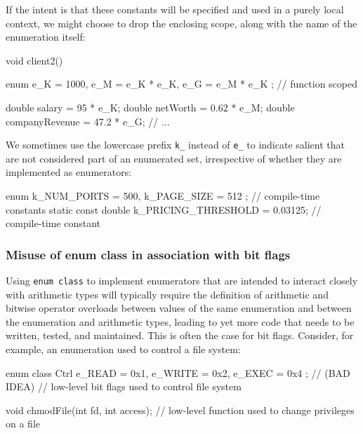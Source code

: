 \noindent If the intent is that these constants will be specified and used in a
purely local context, we might choose to drop the enclosing scope, along
with the name of the enumeration itself: 

\begin{emcppslisting}
void client2()
{
    enum { e_K = 1000, e_M = e_K * e_K, e_G = e_M * e_K };  // function scoped

    double salary = 95 * e_K;
    double netWorth = 0.62 * e_M;
    double companyRevenue = 47.2 * e_G;
    // ...
}
\end{emcppslisting}

\noindent We sometimes use the
lowercase prefix \lstinline!k_! instead of \lstinline!e_! to indicate
salient  that are not considered part
of an enumerated set, irrespective of whether they are implemented as
enumerators:

\begin{emcppslisting}[language=C++]
enum { k_NUM_PORTS = 500, k_PAGE_SIZE = 512 };     // compile-time constants
static const double k_PRICING_THRESHOLD = 0.03125; // compile-time constant
\end{emcppslisting}

\subsubsection[Misuse of \lstinline!enum! \lstinline!class! in association with bit flags]{Misuse of {\SubsubsecCode enum} {\SubsubsecCode class} in association with bit flags}\label{misuse-of-enum-class-in-association-with-bit-flags}

Using \lstinline!enum!~\lstinline!class! to implement enumerators that are
intended to interact closely with arithmetic types will typically
require the definition of arithmetic and bitwise operator overloads
between values of the same enumeration and between the enumeration and
arithmetic types, leading to yet more code that needs to be written,
tested, and maintained. This is often the case for bit flags. Consider, for example, an
enumeration used to control a file system:

\begin{emcppslisting}[emcppsbatch=e14]
enum class Ctrl { e_READ = 0x1, e_WRITE = 0x2, e_EXEC = 0x4 };  // (BAD IDEA)
    // low-level bit flags used to control file system

void chmodFile(int fd, int access);
    // low-level function used to change privileges on a file
\end{emcppslisting}

